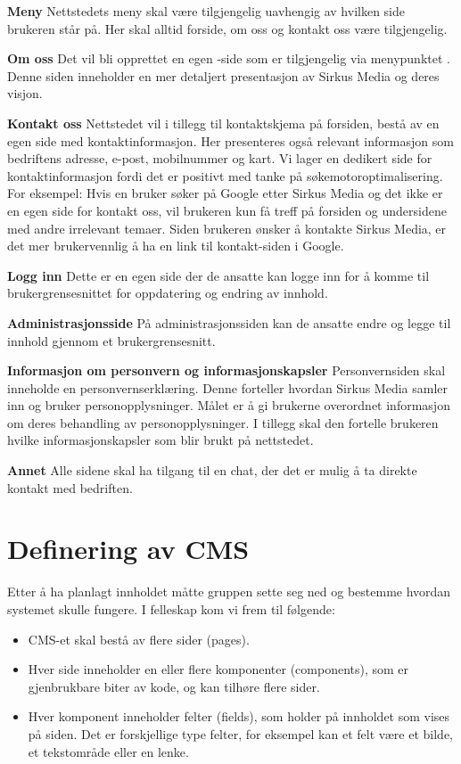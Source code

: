 \textbf{Meny} Nettstedets meny skal være tilgjengelig uavhengig av hvilken side brukeren står på. Her skal alltid forside, om oss og kontakt oss være tilgjengelig. 

\textbf{Om oss} Det vil bli opprettet en egen -side som er tilgjengelig via menypunktet . Denne siden inneholder en mer detaljert presentasjon av Sirkus Media og deres visjon.

\textbf{Kontakt oss} Nettstedet vil i tillegg til kontaktskjema på forsiden, bestå av en egen side med kontaktinformasjon. Her presenteres også relevant informasjon som bedriftens adresse, e-post, mobilnummer og kart. Vi lager en dedikert side for kontaktinformasjon fordi det er positivt med tanke på søkemotoroptimalisering. For eksempel: Hvis en bruker søker på Google etter Sirkus Media og det ikke er en egen side for kontakt oss, vil brukeren kun få treff på forsiden og undersidene med andre irrelevant temaer. Siden brukeren ønsker å kontakte Sirkus Media, er det mer brukervennlig å ha en link til kontakt-siden i Google.

\textbf{Logg inn} Dette er en egen side der de ansatte kan logge inn for å komme til brukergrensesnittet for oppdatering og endring av innhold.

\textbf{Administrasjonsside}  På administrasjonssiden kan de ansatte endre og legge til innhold gjennom et brukergrensesnitt.

\textbf{Informasjon om personvern og informasjonskapsler} Personvernsiden skal inneholde en personvernserklæring. Denne forteller hvordan Sirkus Media samler inn og bruker personopplysninger. Målet er å gi brukerne overordnet informasjon om deres behandling av personopplysninger. I tillegg skal den fortelle brukeren hvilke informasjonskapsler som blir brukt på nettstedet.

\textbf{Annet} Alle sidene skal ha tilgang til en chat, der det er mulig å ta direkte kontakt med bedriften.

\section{Definering av CMS}
\label{sec-planning-cms}
Etter å ha planlagt innholdet måtte gruppen sette seg ned og bestemme hvordan systemet skulle fungere. I felleskap kom vi frem til følgende:

\begin{itemize}
\item CMS-et skal bestå av flere sider (pages).
\item Hver side inneholder en eller flere komponenter (components), som er gjenbrukbare biter av kode, og kan tilhøre flere sider.
\item Hver komponent inneholder felter (fields), som holder på innholdet som vises på siden. Det er forskjellige type felter, for eksempel kan et felt være et bilde, et tekstområde eller en lenke. 
\end{itemize}

